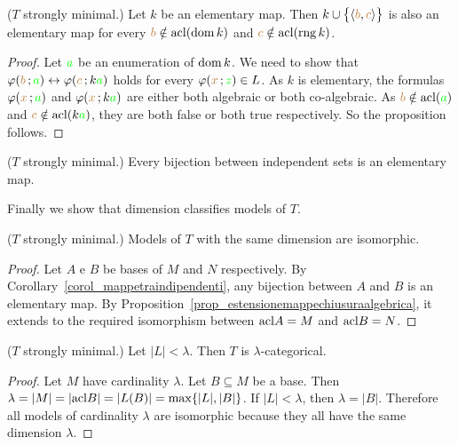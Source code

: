\begin{proposition}\label{prop_mappetraindipendenti}
  ($T$ strongly minimal.) 
  Let $k$ be an elementary map.
  Then $k\cup\big\{\langle{\color{brown}b},{\color{brown} c}\rangle\big\}$ is also an elementary map for every ${\color{brown} b}\notin{\rm acl}(\mathop{\rm dom} k)$ and ${\color{brown} c}\notin{\rm acl}(\mathop{\rm rng} k)$.
\end{proposition}
\begin{proof}
  Let ${\color{green} a}$ be an enumeration of $\mathop{\rm dom} k$.
  We need to show that $\varphi({\color{brown} b}\,;{\color{green} a})\leftrightarrow\varphi({\color{brown} c}\,;k{\color{green} a})$ holds for every $\varphi({\color{brown} x}\,;{\color{green} z})\in L$.
  As $k$ is elementary, the formulas $\varphi({\color{brown} x}\,;{\color{green} a})$ and $\varphi({\color{brown} x}\,;k{\color{green} a})$ are either both algebraic or both co-algebraic.
  As ${\color{brown} b}\notin{\rm acl}({\color{green} a})$ and ${\color{brown} c}\notin{\rm acl}(k{\color{green} a})$, they are both false or both true respectively.
  So the proposition follows.
\end{proof}

\begin{corollary}\label{corol_mappetraindipendenti} 
  ($T$ strongly minimal.)
  Every bijection between independent sets is an elementary map.
\end{corollary}

Finally we show that dimension classifies models of $T$.

\begin{theorem}\label{thm_dim_classify_sm_models}
  ($T$ strongly minimal.)
  Models of $T$ with the same dimension are isomorphic.
\end{theorem}
\begin{proof}
  Let $A$ e $B$ be bases of $M$ and $N$ respectively.
  By Corollary~\ref{corol_mappetraindipendenti}, any bijection between $A$ and $B$ is an elementary map.
  By Proposition~\ref{prop_estensionemappechiusuraalgebrica}, it extends to the required isomorphism between ${\rm acl} A=M$ and ${\rm acl} B=N$.
\end{proof}

\begin{corollary} 
  ($T$ strongly minimal.) Let $|L|<\lambda$. Then $T$ is $\lambda$-categorical.
\end{corollary}
\begin{proof}
  Let $M$ have cardinality $\lambda$. 
  Let $B\subseteq M$  be a base.
  Then $\lambda=|M|=|{\rm acl} B|=|L(B)|=\max\{|L|,|B|\}$.
  If $|L|<\lambda$, then $\lambda=|B|$.
  Therefore all models of cardinality $\lambda$ are isomorphic because they all have the same dimension $\lambda$.
\end{proof}

